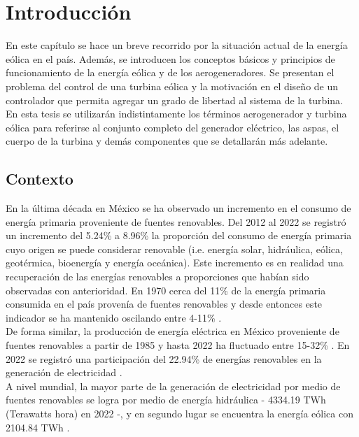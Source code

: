 \chapter{Introducción} \label{intro_chapter}

En este capítulo se hace un breve recorrido por la situación actual de la energía eólica en el país. 
Además, se introducen los conceptos básicos y principios de funcionamiento de la energía eólica y de 
los aerogeneradores. Se presentan el problema del control de una turbina eólica y la motivación en 
el diseño de un controlador que permita agregar un grado de libertad al sistema de la turbina. 
\\

\noindent En esta tesis se utilizarán indistintamente los términos aerogenerador y turbina eólica 
para referirse al conjunto completo del generador eléctrico, las aspas, el cuerpo de la turbina y 
demás componentes que se detallarán más adelante. 


\section{Contexto}
\noindent En la última década en México se ha observado un incremento en el consumo de energía primaria 
proveniente de fuentes renovables. Del 2012 al 2022 se registró un incremento del 5.24\% a 8.96\% 
la proporción del consumo de energía primaria cuyo origen se puede considerar renovable (i.e. 
energía solar, hidráulica, eólica, geotérmica, bioenergía y energía oceánica). Este incremento 
es en realidad una recuperación de las energías renovables a proporciones que habían sido observadas 
con anterioridad. En 1970 cerca del 11\% de la energía primaria consumida en el país provenía 
de fuentes renovables y desde entonces este indicador se ha mantenido oscilando entre 4-11\% \cite{statistical-review}.
\\

\noindent De forma similar, la producción de energía eléctrica en México proveniente de fuentes 
renovables a partir de 1985 y hasta 2022 ha fluctuado entre 15-32\% \cite{statistical-review}. 
En 2022 se registró una participación del 22.94\% de energías renovables en la generación de 
electricidad \cite{owid-renewable-energy}.
\\

\noindent A nivel mundial, la mayor parte de la generación de electricidad por medio de fuentes 
renovables se logra por medio de energía hidráulica - 4334.19 TWh (Terawatts hora) en 2022 -, y 
en segundo lugar se encuentra la energía eólica con 2104.84 TWh \cite{owid-renewable-energy}.
\\

